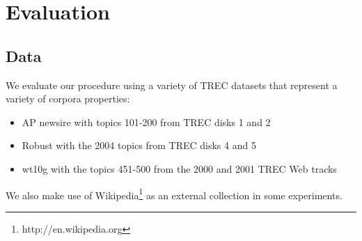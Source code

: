 \documentclass{sig-alternate}
\begin{document}
\section{Evaluation}\label{section.evaluation}

\subsection{Data}\label{section.evaluation.data}

We evaluate our procedure using a variety of TREC datasets that represent a variety of corpora properties:

\begin{itemize}
	\item AP newsire with topics 101-200 from TREC disks 1 and 2
	\item Robust with the 2004 topics from TREC disks 4 and 5
	\item wt10g with the topics 451-500 from the 2000 and 2001 TREC Web tracks
\end{itemize}

We also make use of Wikipedia\footnote{http://en.wikipedia.org} as an external collection in some experiments.




\end{document}
